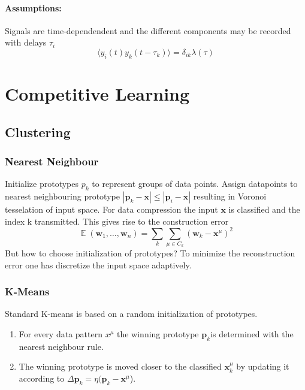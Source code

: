 \documentclass[11pt]{article}
\DeclareMathOperator{\E}{\mathbb{E}}
\newcommand\abs[1]{\left|#1\right|}
\begin{document}
\paragraph{Assumptions:} Signals are time-dependendent and the different components may be recorded with delays $\tau_i$
\[
	\langle y_i(t)y_k(t-\tau_k) \rangle = \delta_{ik}\lambda(\tau)
\]
\section{Competitive Learning}

\subsection{Clustering}
\subsubsection{Nearest Neighbour}
Initialize prototypes $p_k$ to represent groups of data points. Assign datapoints to nearest neighbouring prototype $\abs{\mathbf{p}_k-\mathbf{x}}\leq\abs{\mathbf{p}_i-\mathbf{x}}$ resulting in Voronoi tesselation of input space. For data compression the input $\mathbf{x}$ is classified and the index k transmitted. This gives rise to the construction error
\[
\E(\mathbf{w}_1, \dots, \mathbf{w}_n) = \sum_k \sum_{\mu \in C_k} (\mathbf{w}_k-\mathbf{x}^\mu)^2
\]
But how to choose initialization of prototypes? To minimize the reconstruction error one has discretize the input space adaptively.
\subsubsection{K-Means}
Standard K-means is based on a random initialization of prototypes. 
\begin{enumerate}
\item For every data pattern $x^\mu$ the winning prototype $\mathbf{p}_k$is determined with the nearest neighbour rule.
\item The winning prototype is moved closer to the classified $\mathbf{x}_k^\mu$ by updating it according to $\Delta \mathbf{p}_k = \eta (\mathbf{p}_k-\mathbf{x}^\mu$).
\end{enumerate}
\end{document}
